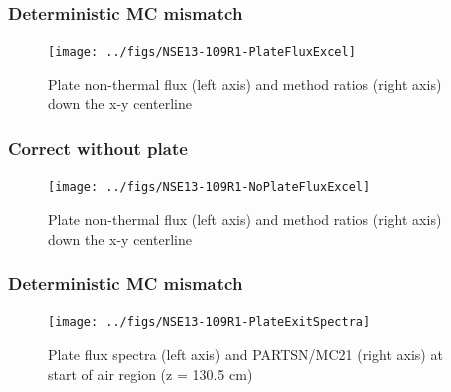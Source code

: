 \documentclass[xcolor=x11names,compress, handout]{beamer}
\renewcommand{\(}{\begin{columns}}
\renewcommand{\)}{\end{columns}}
\newcommand{\<}[1]{\begin{column}{#1}}
\renewcommand{\>}{\end{column}}
\begin{document}
\begin{frame}[fragile]
  \frametitle{Deterministic MC mismatch}
 \begin{figure}[p]
   \begin{center}
     \texttt{[image: ../figs/NSE13-109R1-PlateFluxExcel]}
   \end{center}
   \caption{Plate non-thermal flux (left axis) and method ratios (right axis) down the x-y centerline}
   \label{fig:PlateFlux}
 \end{figure}
\end{frame}


\begin{frame}[fragile]
  \frametitle{Correct without plate}
 \begin{figure}[p]
   \begin{center}
     \texttt{[image: ../figs/NSE13-109R1-NoPlateFluxExcel]}
   \end{center}
   \caption{Plate non-thermal flux (left axis) and method ratios (right axis) down the x-y centerline}
   \label{fig:noPlateFlux}
 \end{figure}
\end{frame}


\begin{frame}[fragile]
  \frametitle{Deterministic MC mismatch}
 \begin{figure}[p]
   \begin{center}
     \texttt{[image: ../figs/NSE13-109R1-PlateExitSpectra]}
   \end{center}
   \caption{Plate flux spectra (left axis) and PARTSN/MC21 (right axis) at start of air region (z = 130.5 cm)}
   \label{fig:PlateExit}
 \end{figure}
\end{frame}
\end{document}
